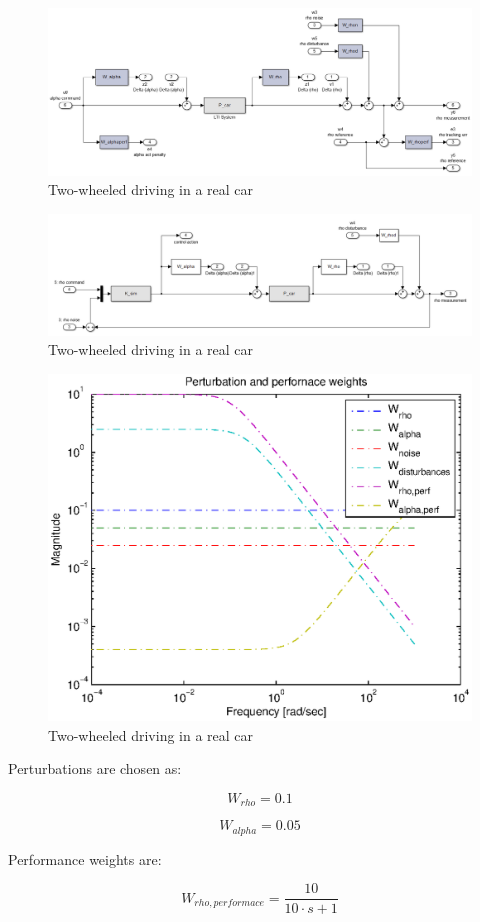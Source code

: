\documentclass[conference]{IEEEtran}
\begin{document}
\begin{figure}[h]
\centering
  \includegraphics[width=.47\textwidth]{pics/model_car.png} 
  \caption{Two-wheeled driving in a real car}  
  \label{figure:arab_driving}
\end{figure}


\begin{figure}[h]
\centering
  \includegraphics[width=.47\textwidth]{pics/model_car_unweighted.png} 
  \caption{Two-wheeled driving in a real car}  
  \label{figure:arab_driving}
\end{figure}



\begin{figure}[h]
\centering
  \includegraphics[width=.47\textwidth]{pics/weights.eps} 
  \caption{Two-wheeled driving in a real car}  
  \label{figure:arab_driving}
\end{figure}

Perturbations are chosen as:

\begin{equation}
{W_{rho}} = 0.1
\end{equation}

\begin{equation}
{W_{alpha}} = 0.05
\end{equation}

Performance weights are:

\begin{equation}
{W_{rho,performace}} = \frac{{10}}{{10 \cdot s + 1}}
\end{equation}
\end{document}
